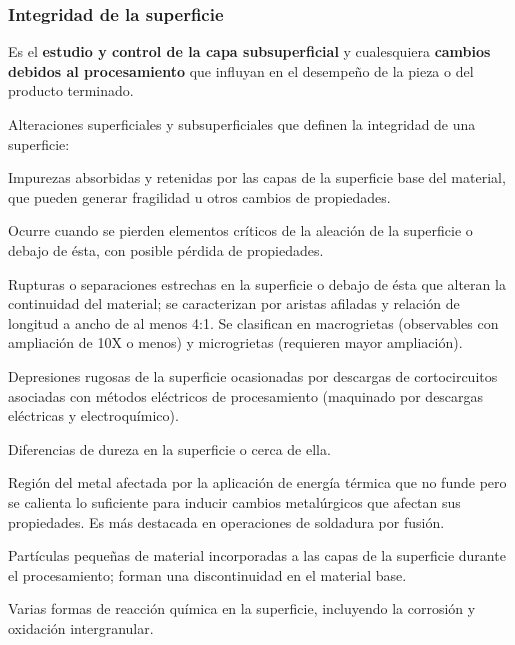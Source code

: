 \documentclass[12pt,a4paper]{article}
\begin{document}
\subsubsection{Integridad de la superficie}
Es el \textbf{estudio y control de la capa subsuperficial} y cualesquiera
\textbf{cambios debidos al procesamiento} que influyan en el desempeño de la
pieza o del producto terminado.

Alteraciones superficiales y subsuperficiales que definen la integridad de una
superficie:
\begin{description}[leftmargin=0pt,style=nextline]
	\item[Absorción] Impurezas absorbidas y retenidas por las capas de la
	      superficie base del material, que pueden generar fragilidad u otros
	      cambios de
	      propiedades.
	\item[Agotamiento de la aleación] Ocurre cuando se pierden elementos críticos
	      de la aleación de la superficie o debajo de ésta, con posible pérdida de
	      propiedades.
	\item[Grietas] Rupturas o separaciones estrechas en la superficie o debajo de
	      ésta que alteran la continuidad del material; se caracterizan por
	      aristas
	      afiladas y relación de longitud a ancho de al menos 4:1. Se clasifican
	      en
	      macrogrietas (observables con ampliación de 10X o menos) y microgrietas
	      (requieren mayor ampliación).
	\item[Cráteres] Depresiones rugosas de la superficie ocasionadas por descargas
	      de cortocircuitos asociadas con métodos eléctricos de procesamiento
	      (maquinado
	      por descargas eléctricas y electroquímico).
	\item[Cambios en la dureza] Diferencias de dureza en la superficie o cerca de
	      ella.
	\item[Zona afectada por el calor (HAZ)] Región del metal afectada por la
	      aplicación de energía térmica que no funde pero se calienta lo
	      suficiente para
	      inducir cambios metalúrgicos que afectan sus propiedades. Es más
	      destacada en
	      operaciones de soldadura por fusión.
	\item[Inclusiones] Partículas pequeñas de material incorporadas a las capas de
	      la superficie durante el procesamiento; forman una discontinuidad en el
	      material
	      base.
	\item[Ataque intergranular] Varias formas de reacción química en la
	      superficie, incluyendo la corrosión y oxidación intergranular.

\end{description}
\end{document}
